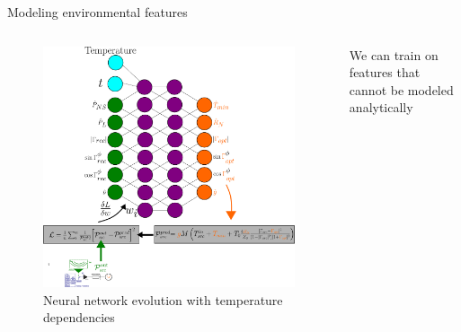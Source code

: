 \documentclass[aspectratio=169]{beamer}
\begin{document}
\begin{frame}{\small{Modeling environmental features}}
    \begin{columns}[c]
        \begin{column}{0.55\textwidth}
            \begin{figure}
                \centering
                \includegraphics[width=\textwidth]{images/nn_time_tpm.png}
                \caption{\tiny Neural network evolution with temperature
                dependencies}
            \end{figure}
        \end{column}
        \begin{column}{0.45\textwidth}
            \begin{tcolorbox}[colback=blue!5!white,colframe=blue!75!black,title=]
                We can train on features that cannot be modeled analytically
            \end{tcolorbox}
        \end{column}
    \end{columns}
\end{frame}
\end{document}
